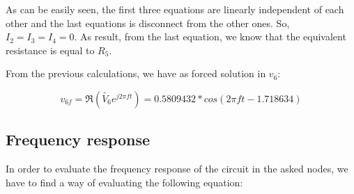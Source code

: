 \hfill


As can be easily seen, the first three equations are linearly independent of each other and the last equations is disconnect from the other ones. So, $I_2 = I_3 = I_4 = 0$. As result, from the last equation, we know that
the equivalent resistance is equal to $R_5$.


From the previous calculations, we have as forced solution in $v_6$:

\begin{equation}
  v_{6f} = \Re (\tilde{V_6} e^{j 2\pi f t}) = 0.5809432*cos(2 \pi f t - 1.718634)
  \label{forcedSolution}
\end{equation}



\subsection{Frequency response}

In order to evaluate the frequency response of the circuit in the asked nodes, we have to find a way of evaluating the following equation:


